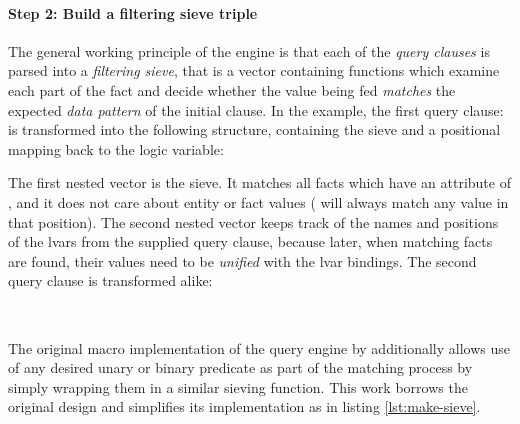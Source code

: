 \paragraph{Step 2: Build a filtering sieve triple}

The general working principle of the engine is that each of the \emph{query clauses} is parsed into a \emph{filtering sieve}, that is a vector containing functions which examine each part of the fact and decide whether the value being fed \emph{matches} the expected \emph{data pattern} of the initial clause. In the example, the first query clause:  is transformed into the following structure, containing the sieve and a positional mapping back to the logic variable:

\begin{center}
  \lisp{\{:sieve [true #(= \% :name) true] :lvars ["?e" nil "?name"]]\}}
\end{center}

The first nested vector is the sieve. It matches all facts which have an attribute of , and it does not care about entity or fact values ( will always match any value in that position). The second nested vector keeps track of the names and positions of the lvars from the supplied query clause, because later, when matching facts are found, their values need to be \emph{unified} with the lvar bindings. The second query clause is transformed alike:

\begin{center}
   \\
  \lisp{\{:sieve [true #(= \% :room) #(= \% :room/32)] :lvars ["?e" nil nil]]\}}
\end{center}

The original macro implementation of the query engine by \cite{rubin15aosadb} additionally allows use of any desired unary or binary predicate as part of the matching process by simply wrapping them in a similar sieving function. This work borrows the original design and simplifies its implementation as in listing \ref{lst:make-sieve}.


